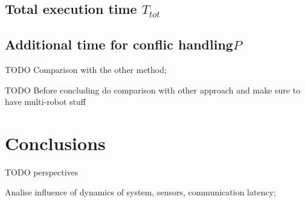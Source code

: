 \documentclass[eprint]{actapoly}
\begin{document}
\subsection{Total execution time $T_{tot}$}



\subsection{Additional time for conflic handling$P$}


TODO Comparison with the other method;

TODO Before concluding do comparison with other approach and make sure to have 
multi-robot stuff

\section{Conclusions}





TODO perspectives

Analise influence of dynamics of system, sensors, communication latency;



\end{document}
